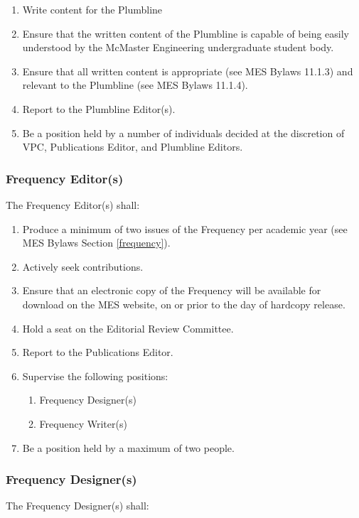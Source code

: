 \begin{enumerate} 
  \item    
   Write content for the Plumbline 
  \item     
   Ensure that the written content of the Plumbline is capable of being easily understood by the McMaster Engineering undergraduate student body. 
  \item    
   Ensure that all written content is appropriate (see MES Bylaws 11.1.3) and relevant to the Plumbline (see MES Bylaws 11.1.4). 
  \item    
   Report to the Plumbline Editor(s). 
  \item    
   Be a position held by a number of individuals decided at the discretion of VPC, Publications Editor, and Plumbline Editors. 
\end{enumerate} 

\subsubsection{Frequency Editor(s)}
\label{frequency-editors}
The Frequency Editor(s) shall:

\begin{enumerate}
 \item
  Produce a minimum of two issues of the Frequency per academic year (see MES Bylaws Section \ref{frequency}).
 \item
  Actively seek contributions.
 \item
  Ensure that an electronic copy of the Frequency will be available for download on the MES website, on or prior to the day of hardcopy release.
 \item     
  Hold a seat on the Editorial Review Committee. 
 \item    
  Report to the Publications Editor.
 \item
  Supervise the following positions: 
  \begin{enumerate} 
    \item    
     Frequency Designer(s) 
    \item     
     Frequency Writer(s)   
  \end{enumerate} 
 \item  
  Be a position held by a maximum of two people.

\end{enumerate}

\subsubsection{Frequency Designer(s)}
\label{frequency-designers}
The Frequency Designer(s) shall: 

